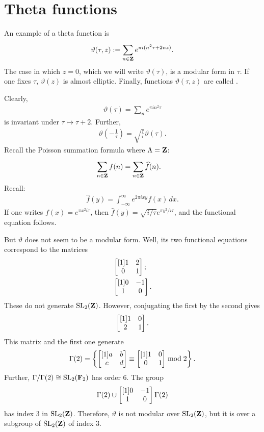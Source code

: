 \documentclass[11pt, oneside,margin=1in]{article}
\begin{document}
\section{Theta functions}

An example of a theta function is
\begin{align*}
	\vartheta (\tau,z) := \sum_{n\in\mathbf Z}^{} e^{\pi i(n^2\tau + 2nz)}.
\end{align*}
The case in which $z=0$, which we will write $\vartheta (\tau)$, is a modular form in $\tau$. If one fixes $\tau$, $\vartheta(z)$ is almost elliptic. Finally, functions $\vartheta(\tau, z)$ are called . 

Clearly,
\begin{align*}
	\vartheta(\tau) =  \sum_{n}^{} e^{\pi i n^2\tau}
\end{align*}
is invariant under $\tau \longmapsto \tau + 2$. Further,
\begin{align*}
	\vartheta \left( -\frac{1}{\tau} \right) = \sqrt{\frac{\tau}{i}} \vartheta(\tau).
\end{align*}
Recall the Poisson summation formula where $\Lambda = \mathbf Z$:
\begin{align*}
	\sum_{n\in\mathbf Z}^{} f(n) &=  \sum_{n\in\mathbf Z}^{} \widehat{f}(n).
\end{align*}
Recall:
\begin{align*}
\widehat{f}(y) =  \int_{-\infty}^{\infty} e^{2\pi i x y} f(x) \, dx. 	
\end{align*}
If one writes $f(x) = e^{\pi x^2 i \tau}$, then $\widehat{f}(y) =  \sqrt{i/\tau} e^{\pi y^2/i\tau}$, and the functional equation follows.

But $\vartheta$ does not seem to be a modular form. Well, its two functional equations correspond to the matrices 
\begin{align*}
&	\begin{bmatrix} [1] 1&2\\0&1\end{bmatrix}; \\&\begin{bmatrix} [1] 0 &-1\\1&0\end{bmatrix}.
\end{align*}
These do not generate $\operatorname{SL}_{2}(\mathbf Z)$. However, conjugating the first by the second gives 
\begin{align*}
	\begin{bmatrix} [1] 1&0\\2&1\end{bmatrix}.
\end{align*}
This matrix and the first one generate 
\begin{align*}
	\Gamma(2) =  \left\{ \begin{bmatrix} [1] a&b\\c&d\end{bmatrix} \equiv \begin{bmatrix} [1] 1&0\\0&1\end{bmatrix} \bmod 2 \right\} .
\end{align*}
Further, $\Gamma/\Gamma(2) \cong  \operatorname{SL}_{2}(\mathbf F_2)$ has order $6$. The group
\begin{align*}
	\Gamma(2) \cup \begin{bmatrix} [1] 0&-1\\1&0\end{bmatrix} \Gamma (2)
\end{align*}
has index $3$ in $\operatorname{SL}_{2}(\mathbf Z)$. Therefore, $\vartheta$ is not modular over $\operatorname{SL}_{2}(\mathbf Z)$, but it is over a subgroup of $\operatorname{SL}_{2}(\mathbf Z)$ of index $3$.
\end{document}

